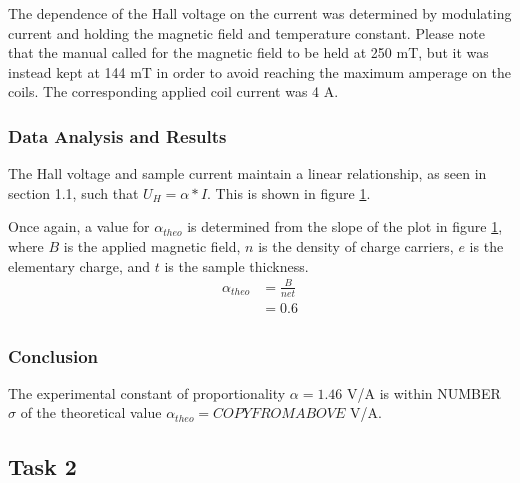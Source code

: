 \documentclass[a4paper]{article}
\begin{document}
\qq The dependence of the Hall voltage on the current was determined 
by modulating current and holding the magnetic field and temperature 
constant. Please note that the manual called for the magnetic field to 
be held at 250 mT, but it was instead kept at 144 mT in order to 
avoid reaching the maximum amperage on the coils. The corresponding
applied coil current was 4 A.

\subsubsection{Data Analysis and Results}
The Hall voltage and sample current maintain a linear relationship, as seen in section 1.1, such that $U_H = \alpha * I$. This is shown in figure \ref{task31plot}.

\begin{figure}[H]
\centering
\label{task31plot}
\end{figure}

Once again, a value for $\alpha_{theo}$ is determined from the slope of the plot in figure \ref{task31plot}, where $B$ is the applied magnetic field, $n$ is the density of charge carriers, $e$ is the elementary charge, and $t$ is the sample thickness.
\begin{align*}
\alpha_{theo} &= \frac{B}{net} \\
			  &= 0.6 \\
\end{align*}

\subsubsection{Conclusion}
The experimental constant of proportionality $\alpha = 1.46 $ V/A is within NUMBER $\sigma$ of the theoretical value $\alpha_{theo} = COPYFROMABOVE$ V/A.

\subsection{Task 2}
\end{document}
